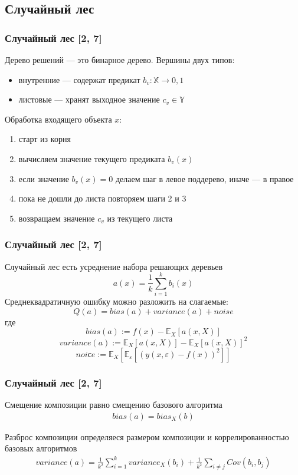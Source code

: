 \documentclass{beamer}
\newcommand{\COV}[2]{Cov\left(#1, #2\right)}
\renewcommand{\epsilon}{\varepsilon}
\begin{document}
\subsection{Случайный лес}

\begin{frame}
    \frametitle{Случайный лес [2, 7]}

    Дерево решений --- это бинарное дерево.
    Вершины двух типов:
    \begin{itemize}
        \item внутренние --- содержат предикат $b_v: \mathbb{X} \rightarrow {0, 1}$
        \item листовые --- хранят выходное значение $c_v \in \mathbb{Y}$
    \end{itemize}

    Обработка входящего объекта $x$:
    \begin{enumerate}
        \item старт из корня
        \item вычисляем значение текущего предиката $b_v(x)$
        \item если значение $b_v(x) = 0$ делаем шаг в левое поддерево, иначе --- в правое
        \item пока не дошли до листа повторяем шаги 2 и 3
        \item возвращаем значение $c_v$ из текущего листа
    \end{enumerate}
\end{frame}

\begin{frame}
    \frametitle{Случайный лес [2, 7]}

    Случайный лес есть усреднение набора решающих деревьев
    \[
        a(x) = \frac{1}{k} \sum_{i=1}^{k} b_i(x)
    \]
    Среднеквадратичную ошибку можно разложить на слагаемые:
    \[
        Q(a) = bias(a) + variance(a) + noise
    \]
    где 
    \[
        bias(a) := f(x) - \mathbb{E}_X\left[a(x, X)\right]
    \]
    \[
        variance(a) := \mathbb{E}_X\left[a(x, X)\right] -\mathbb{E}_X\left[a(x, X)\right]^2
    \]
    \[
        noiсe := \mathbb{E}_X\left[\mathbb{E}_{\epsilon}\left[\left( y(x, \epsilon) - f(x) \right)^2\right]\right]
    \]
\end{frame}

\begin{frame}
    \frametitle{Случайный лес [2, 7]}

    Смещение композиции равно смещению базового алгоритма
    \begin{align*}
        bias(a) = bias_X(b)
    \end{align*}
    
    Разброс композиции определяеся размером композиции и коррелированностью базовых алгоритмов
    \begin{align*}
    	variance(a) =
         \frac{1}{k^2} \sum_{i=1}^{k} variance_X(b_i) + 
        \frac{1}{k^2} \sum_{i \ne j} \COV{b_i}{b_j}
    \end{align*}

\end{frame}
\end{document}
